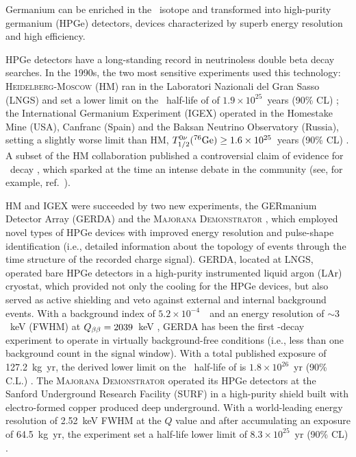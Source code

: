 %
Germanium can be enriched in the \bb\ isotope and transformed into high-purity germanium (HPGe) detectors, devices characterized by superb energy resolution and high efficiency. 

HPGe detectors have a long-standing record in neutrinoless double beta decay searches. In the 1990s, the two most sensitive experiments used this technology: \textsc{Heidelberg-Moscow} (HM) ran in the Laboratori Nazionali del Gran Sasso (LNGS) and set a lower limit on the \bbonu\ half-life of  of $1.9 \times 10^{25}$~years (90\% CL) \cite{Klapdor-Kleingrothaus:2000eir}; the International Germanium Experiment (IGEX) operated in the Homestake Mine (USA), Canfranc (Spain) and the Baksan Neutrino Observatory (Russia), setting a slightly worse limit than HM, $T^{0\nu}_{1/2}(^{76}\mathrm{Ge}) \geq 1.6 \times 10^{25}$~years (90\% CL) \cite{IGEX:2002bce}. A subset of the HM collaboration published a controversial claim of evidence for \bbonu\ decay \cite{Klapdor-Kleingrothaus:2001oba, Klapdor-Kleingrothaus:2006zcr}, which sparked at the time an intense debate in the community (see, for example, ref.~\cite{Aalseth:2002dt}). 

HM and IGEX were succeeded by two new experiments, the GERmanium Detector Array (GERDA) \cite{GERDA:2020xhi} and the \textsc{Majorana Demonstrator} \cite{Majorana:2022udl}, which employed novel types of HPGe devices with improved energy resolution and pulse-shape identification (i.e., detailed information about the topology of events through the time structure of the recorded charge signal). GERDA, located at LNGS, operated bare HPGe detectors in a high-purity instrumented liquid argon (LAr) cryostat, which provided not only the cooling for the HPGe devices, but also served as active shielding and veto against external and internal background events. With a background index of $5.2\times10^{-4}$~\ckky\ and an energy resolution of $\sim3$~keV (FWHM) at $Q_{\beta\beta}=2039$~keV \cite{GERDA:2020xhi}, GERDA has been the first \bbonu-decay experiment to operate in virtually background-free conditions (i.e., less than one background count in the signal window). With a total published exposure of 127.2~kg~yr, the derived lower limit on the \bbonu\ half-life of  is $1.8\times10^{26}$~yr (90\% C.L.) \cite{GERDA:2020xhi}. The \textsc{Majorana Demonstrator} operated its HPGe detectors at the Sanford Underground Research Facility (SURF) in a high-purity shield built with electro-formed copper produced deep underground. With a world-leading energy resolution of 2.52~keV FWHM at the $Q$ value and after accumulating an exposure of 64.5~kg~yr, the experiment set a half-life lower limit of $8.3\times10^{25}$~yr (90\% CL) \cite{Majorana:2022udl}.

